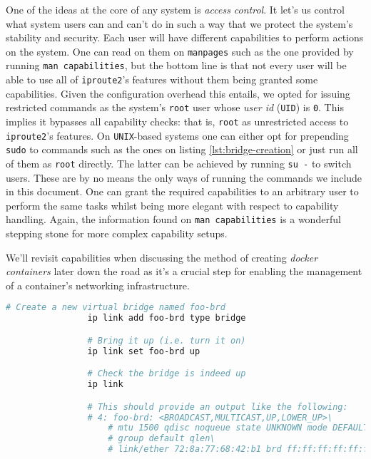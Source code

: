                 One of the ideas at the core of any system is \textit{access control}. It let's us control what system users can and can't do in such a way that we protect the system's stability and security. Each user will have different capabilities to perform actions on the system. One can read on them on \texttt{manpages} such as the one provided by running \texttt{man capabilities}, but the bottom line is that not every user will be able to use all of \texttt{iproute2}'s features without them being granted some capabilities. Given the configuration overhead this entails, we opted for issuing restricted commands as the system's \texttt{root} user whose \textit{user id} (\texttt{UID}) is \texttt{0}. This implies it bypasses all capability checks: that is, \texttt{root} as unrestricted access to \texttt{iproute2}'s features. On \texttt{UNIX}-based systems one can either opt for prepending \texttt{sudo} to commands such as the ones on listing \ref{lst:bridge-creation} or just run all of them as  \texttt{root} directly. The latter can be achieved by running \texttt{su -} to switch users. These are by no means the only ways of running the commands we include in this document. One can grant the required capabilities to an arbitrary user to perform the same tasks whilst being more elegant with respect to capability handling. Again, the information found on \texttt{man capabilities} is a wonderful stepping stone for more complex capability setups.

                We'll revisit capabilities when discussing the method of creating \textit{docker containers} later down the road as it's a crucial step for enabling the management of a container's networking infrastructure.

            \begin{lstlisting}[language = bash, caption = Instantiating a Virtual Network Bridge., label = lst:bridge-creation]
                # Create a new virtual bridge named foo-brd
                ip link add foo-brd type bridge

                # Bring it up (i.e. turn it on)
                ip link set foo-brd up

                # Check the bridge is indeed up
                ip link

                # This should provide an output like the following:
                # 4: foo-brd: <BROADCAST,MULTICAST,UP,LOWER_UP>\
                    # mtu 1500 qdisc noqueue state UNKNOWN mode DEFAULT
                    # group default qlen\
                    # link/ether 72:8a:77:68:42:b1 brd ff:ff:ff:ff:ff:ff
            \end{lstlisting}

